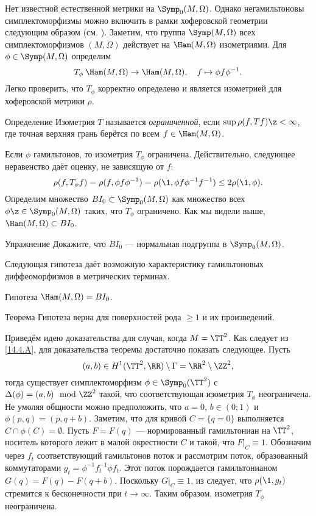Нет известной естественной метрики на $\Symp_0(M,\Omega)$.
Однако негамильтоновы симплектоморфизмы можно включить в рамки
хоферовской геометрии следующим образом (см. \cite{LP}). 
Заметим, что группа $\Symp(M,\Omega)$ всех симплектоморфизмов
$(M,\Omega)$ действует на $\Ham(M,\Omega)$ изометриями.
Для $\phi \in \Symp(M,\Omega)$ определим 
\[T_\phi\: \Ham(M,\Omega) \to \Ham(M,\Omega),
\quad
f \mapsto \phi f\phi^{-1}.\]
Легко проверить, что $T_\phi$ корректно определено и является
изометрией для хоферовской метрики $\rho$. 

\begin{ex*}{Определение}
Изометрия $T$ называется \emph{ограниченной}, если $\sup \rho(f, Tf)\z<\infty$, где
точная верхняя грань берётся по всем $f\in\Ham(M,\Omega)$. 
\end{ex*}


Если $\phi$ гамильтонов, то изометрия $T_\phi$ ограничена.
Действительно, следующее неравенство даёт оценку, не зависящую от $f$:
\[\rho(f,T_\phi f) = \rho(f,\phi f\phi^{-1}) = \rho(\1,\phi
f\phi^{-1}f^{-1})\le 2\rho(\1, \phi).\] 
Определим множество $BI_0 \subset \Symp_0(M,\Omega)$ как множество
всех $\phi \z\in \Symp_0(M,\Omega)$ таких, что $T_\phi$ ограничено. 
Как мы видели выше, $\Ham(M,\Omega)\subset BI_0$.

\begin{ex}{Упражнение}\label{14.4.A}
Докажите, что $BI_0$ --- нормальная подгруппа в $\Symp_0(M,\Omega)$.
\end{ex}

Следующая гипотеза даёт возможную характеристику гамильтоновых
диффеоморфизмов в метрических терминах. 

\begin{ex*}{Гипотеза}
$\Ham(M,\Omega) = BI_0$.
\end{ex*}

\begin{thm}[(\cite{LP})]{Теорема}\label{14.4.B}
Гипотеза верна для поверхностей рода $\ge1$ и их произведений.
\end{thm}

Приведём идею доказательства для случая, когда $M=\TT^2$.
Как следует из \ref{14.4.A}, для доказательства теоремы достаточно
показать следующее.
Пусть
\[(a,b)\in H^1(\TT^2,\RR)\setminus\Gamma=\RR^2\setminus\ZZ^2,\]
тогда существует симплектоморфизм $\phi\in\Symp_0(\TT^2)$ с $\Delta
(\phi) = (a, b) \mod \ZZ^2$ такой, что соответствующая изометрия
$T_\phi$ неограничена. 
Не умоляя общности можно предположить, что $a= 0$, $b \in (0; 1)$ и $\phi(p, q) = (p, q + b)$.
Заметим, что для кривой $C = \{q = 0\}$ выполняется $C \cap \phi(C) = \emptyset$.
Пусть $F = F(q)$ --- нормированный гамильтониан на $\TT^2$, носитель которого лежит в малой окрестности $C$ и такой, что $F|_C \equiv 1$.
Обозначим через $f_t$ соответствующий гамильтонов поток и рассмотрим поток, образованный коммутаторами $g_t = \phi^{-1}f_t^{-1}\phi f_t$.
Этот поток порождается гамильтонианом $G(q) = F(q) - F(q + b)$.
Поскольку $G|_C \equiv 1$, из  следует, что $\rho(\1, g_t)$
стремится к бесконечности при $t \to \infty$. 
Таким образом, изометрия $T_\phi$ неограничена.

